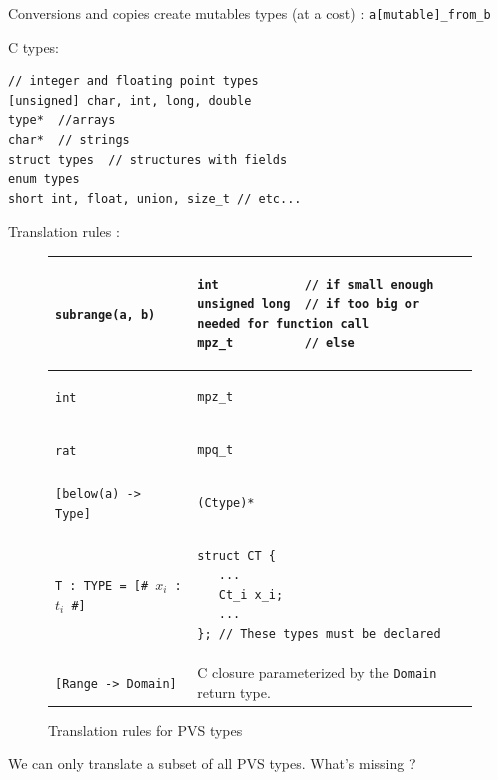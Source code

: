 \documentclass[12pt,a4paper,titlepage]{article}
\newcommand{\cl}[1]{\texttt{#1}}
\begin{document}
Conversions and copies create mutables types (at a cost) :
\cl{a[mutable]\_from\_b}

\cite{fillcomp}







C types:\\
\cite{huss2004c}
\begin{lstlisting}[caption=C types]
// integer and floating point types
[unsigned] char, int, long, double
type*  //arrays
char*  // strings
struct types  // structures with fields
enum types
short int, float, union, size_t // etc...
\end{lstlisting}


Translation rules :

\begin{figure}[h!]
\begin{tabular}{|l|l|}
\hline
\cl{subrange(a, b)} &
\begin{lstlisting}
int            // if small enough
unsigned long  // if too big or needed for function call
mpz_t          // else
\end{lstlisting} \\ \hline
\cl{int} &
\begin{lstlisting}
mpz_t
\end{lstlisting} \\ \hline
\cl{rat} &
\begin{lstlisting}
mpq_t
\end{lstlisting} \\ \hline
\cl{[below(a) -> Type]} &
\begin{lstlisting}
(Ctype)*
\end{lstlisting} \\ \hline
\cl{T : TYPE = [\# $x_i$ : $t_i$ \#]}  &
\begin{lstlisting}
struct CT {
   ...
   Ct_i x_i;
   ...
}; // These types must be declared
\end{lstlisting} \\ \hline
\cl{[Range -> Domain]} & C closure parameterized by the \cl{Domain} return type.\\ \hline
\end{tabular}
\caption{Translation rules for PVS types}
\end{figure}









We can only translate a subset of all PVS types.
What's missing ?
\end{document}
